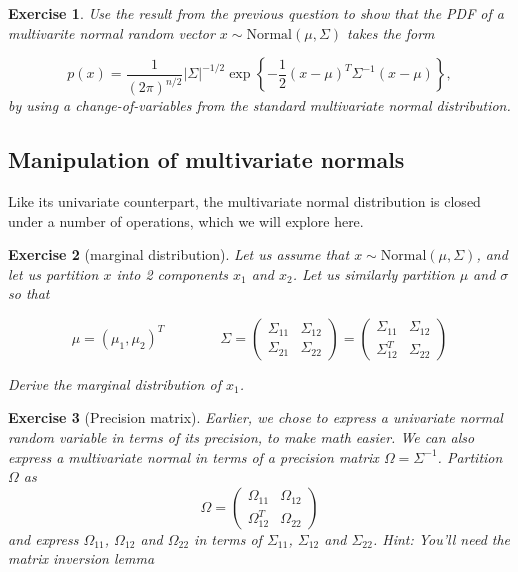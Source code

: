 \documentclass[twoside]{article}
\newcounter{lecnum}
\newtheorem{exercise}{Exercise}[lecnum]
\begin{document}
\begin{exercise}
  Use the result from the previous question to show that the PDF of a multivarite normal random vector $x\sim\mbox{Normal}(\mu, \Sigma)$ takes the form

  $$p(x) = \frac{1}{(2\pi)^{n/2}}|\Sigma|^{-1/2}\exp\left\{-\frac{1}{2}(x-\mu)^T\Sigma^{-1}(x-\mu)\right\},$$
by using a change-of-variables from the standard multivariate normal distribution.
\end{exercise}

\subsection{Manipulation of multivariate normals}
Like its univariate counterpart, the multivariate normal distribution is closed under a number of operations, which we will explore here.

\begin{exercise}[marginal distribution]
  Let us assume that $x\sim \mbox{Normal}(\mu, \Sigma)$, and let us partition $x$ into 2 components $x_1$ and $x_2$. Let us similarly partition $\mu$ and $\sigma$ so that

  $$\mu  = (\mu_1, \mu_2)^T \qquad \qquad \Sigma = \begin{pmatrix}\Sigma_{11} & \Sigma_{12} \\ \Sigma_{21} & \Sigma_{22}\end{pmatrix} = \begin{pmatrix}\Sigma_{11} & \Sigma_{12} \\ \Sigma_{12}^T & \Sigma_{22}\end{pmatrix}$$

  Derive the marginal distribution of $x_1$.
\end{exercise}
\begin{exercise}[Precision matrix]
  Earlier, we chose to express a univariate normal random variable in terms of its precision, to make math easier. We can also express a multivariate normal in terms of a precision matrix $\Omega = \Sigma^{-1}$. Partition $\Omega$ as
  $$\Omega = \begin{pmatrix}\Omega_{11} & \Omega_{12} \\ \Omega_{12}^T & \Omega_{22}\end{pmatrix}$$
  and express $\Omega_{11}$, $\Omega_{12}$ and $\Omega_{22}$ in terms of $\Sigma_{11}$, $\Sigma_{12}$ and $\Sigma_{22}$. \textit{Hint: You'll need the matrix inversion lemma}
\end{exercise}
\end{document}
